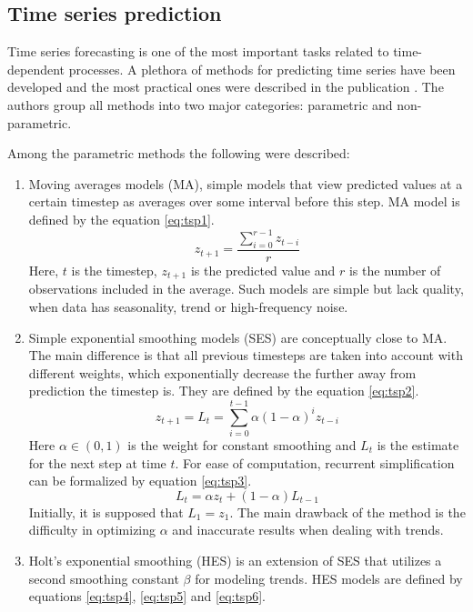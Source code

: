 \documentclass[3p,times,procedia]{elsarticle}
\begin{document}
\subsection{Time series prediction} \label{tsp}

Time series forecasting is one of the most important tasks related to time-dependent processes. A plethora of methods for predicting time series have been developed and the most practical ones were described in the publication \cite{parmezan2019evaluation}. The authors group all methods into two major categories: parametric and non-parametric.

Among the parametric methods the following were described:
\begin{enumerate}
	\item Moving averages models (MA), simple models that view predicted values at a certain timestep as averages over some interval before this step. MA model is defined by the equation \ref{eq:tsp1}.
\begin{equation} \label{eq:tsp1}
z_{t+1} = \frac{\sum\limits_{i=0}^{r-1}z_{t-i}}{r}
\end{equation}
Here, $t$ is the timestep, $z_{t+1}$ is the predicted value and $r$ is the number of observations included in the average. Such models are simple but lack quality, when data has seasonality, trend or high-frequency noise.
\item Simple exponential smoothing models (SES) are conceptually close to MA. The main difference is that all previous timesteps are taken into account with different weights, which exponentially decrease the further away from prediction the timestep is. They are defined by the equation \ref{eq:tsp2}.
\begin{equation} \label{eq:tsp2}
z_{t+1} = L_t = \sum_{i=0}^{t-1} \alpha (1-\alpha)^i z_{t-i}
\end{equation}
Here $\alpha \in (0,1)$ is the weight for constant smoothing and $L_t$ is the estimate for the next step at time $t$. For ease of computation, recurrent simplification can be formalized by equation \ref{eq:tsp3}.
\begin{equation} \label{eq:tsp3}
L_t = \alpha z_t + (1-\alpha) L_{t-1}
\end{equation}
Initially, it is supposed that $L_1 = z_1$. The main drawback of the method is the difficulty in optimizing $\alpha$ and inaccurate results when dealing with trends.
\item Holt's exponential smoothing (HES) is an extension of SES that utilizes a second smoothing constant $\beta$ for modeling trends. HES models are defined by equations \ref{eq:tsp4}, \ref{eq:tsp5} and \ref{eq:tsp6}.

\end{enumerate}
\end{document}
